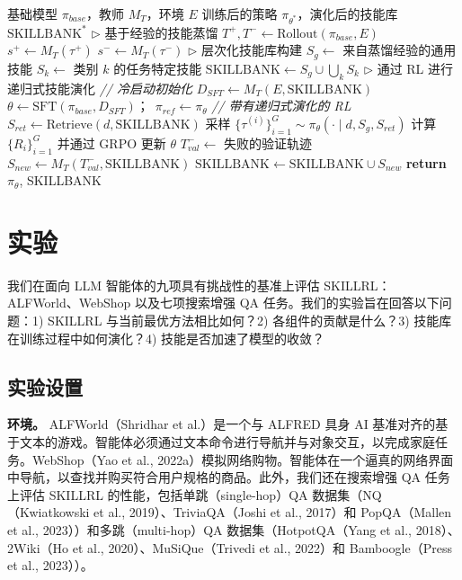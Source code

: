 \documentclass[11pt,UTF8,fontset=fandol]{ctexart}
\begin{document}
\begin{algorithm}[H]
\caption{SKILLRL：递归式技能增强 RL}
\label{alg:1}
\begin{algorithmic}[1]
\Require 基础模型 $\pi_{base}$，教师 $M_T$，环境 $E$
\Ensure 训练后的策略 $\pi_{\theta^*}$，演化后的技能库 $\text{SKILLBANK}^*$
\State $\triangleright$ 基于经验的技能蒸馏
\State $T^+, T^- \leftarrow \text{Rollout}(\pi_{base}, E)$
  \State $s^+ \leftarrow M_T(\tau^+)$
\EndFor
{}
  \State $s^- \leftarrow M_T(\tau^-)$
\EndFor
\State $\triangleright$ 层次化技能库构建
\State $S_g \leftarrow$ 来自蒸馏经验的通用技能
  \State $S_k \leftarrow$ 类别 $k$ 的任务特定技能
\EndFor
\State $\text{SKILLBANK} \leftarrow S_g \cup \bigcup_k S_k$
\State $\triangleright$ 通过 RL 进行递归式技能演化
\State \textit{// 冷启动初始化}
\State $D_{SFT} \leftarrow M_T(E, \text{SKILLBANK})$
\State $\theta \leftarrow \text{SFT}(\pi_{base}, D_{SFT})$；\ $\pi_{ref} \leftarrow \pi_\theta$
\State \textit{// 带有递归式演化的 RL}
    \State $S_{ret} \leftarrow \text{Retrieve}(d, \text{SKILLBANK})$
    \State 采样 $\{\tau^{(i)}\}_{i=1}^G \sim \pi_\theta(\cdot \mid d, S_g, S_{ret})$
    \State 计算 $\{R_i\}_{i=1}^G$ 并通过 GRPO 更新 $\theta$
  \EndFor
    \State $T_{val}^- \leftarrow$ 失败的验证轨迹
    \State $S_{new} \leftarrow M_T(T_{val}^-, \text{SKILLBANK})$
    \State $\text{SKILLBANK} \leftarrow \text{SKILLBANK} \cup S_{new}$
  \EndIf
\EndFor
\State \textbf{return} $\pi_\theta$, SKILLBANK
\end{algorithmic}
\end{algorithm}

\section{实验}

我们在面向 LLM 智能体的九项具有挑战性的基准上评估 SKILLRL：ALFWorld、WebShop 以及七项搜索增强 QA 任务。我们的实验旨在回答以下问题：1) SKILLRL 与当前最优方法相比如何？2) 各组件的贡献是什么？3) 技能库在训练过程中如何演化？4) 技能是否加速了模型的收敛？

\subsection{实验设置}

\textbf{环境。} ALFWorld（Shridhar et al.）是一个与 ALFRED 具身 AI 基准对齐的基于文本的游戏。智能体必须通过文本命令进行导航并与对象交互，以完成家庭任务。WebShop（Yao et al., 2022a）模拟网络购物。智能体在一个逼真的网络界面中导航，以查找并购买符合用户规格的商品。此外，我们还在搜索增强 QA 任务上评估 SKILLRL 的性能，包括单跳（single-hop）QA 数据集（NQ（Kwiatkowski et al., 2019）、TriviaQA（Joshi et al., 2017）和 PopQA（Mallen et al., 2023））和多跳（multi-hop）QA 数据集（HotpotQA（Yang et al., 2018）、2Wiki（Ho et al., 2020）、MuSiQue（Trivedi et al., 2022）和 Bamboogle（Press et al., 2023））。
\end{document}
